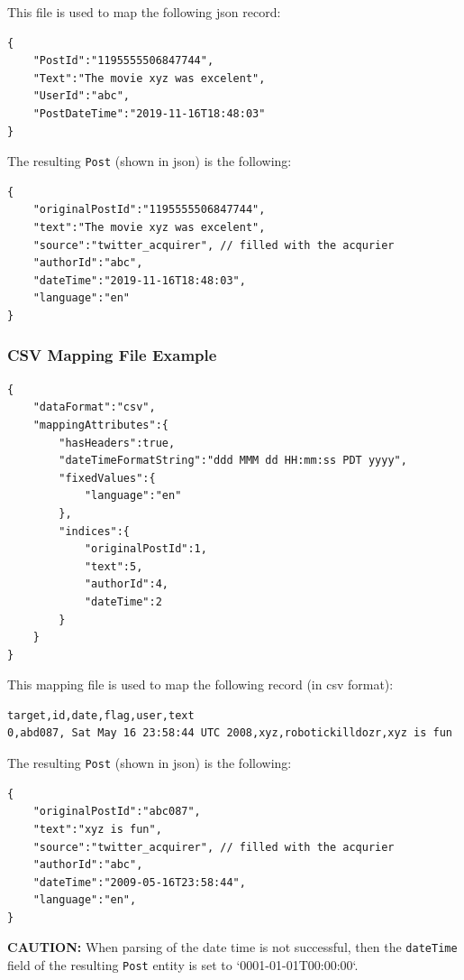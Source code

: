 \documentclass{article}
\begin{document}
This file is used to map the following json record:

\begin{lstlisting}
{
    "PostId":"1195555506847744",
    "Text":"The movie xyz was excelent",
    "UserId":"abc",
    "PostDateTime":"2019-11-16T18:48:03"
}
\end{lstlisting}

The resulting \texttt{Post} (shown in json) is the following:
\begin{lstlisting}
{
    "originalPostId":"1195555506847744",
    "text":"The movie xyz was excelent",
    "source":"twitter_acquirer", // filled with the acqurier
    "authorId":"abc",
    "dateTime":"2019-11-16T18:48:03",
    "language":"en"
}
\end{lstlisting}

\subsubsection{CSV Mapping File Example}\label{section:csv-mapping-file}
\begin{lstlisting}
{
    "dataFormat":"csv",
    "mappingAttributes":{
        "hasHeaders":true,
        "dateTimeFormatString":"ddd MMM dd HH:mm:ss PDT yyyy",
        "fixedValues":{
            "language":"en"
        },
        "indices":{
            "originalPostId":1,
            "text":5,
            "authorId":4,
            "dateTime":2
        }
    }
}
\end{lstlisting}

This mapping file is used to map the following record (in csv format):

\begin{lstlisting}
target,id,date,flag,user,text
0,abd087, Sat May 16 23:58:44 UTC 2008,xyz,robotickilldozr,xyz is fun
\end{lstlisting}

The resulting \texttt{Post} (shown in json) is the following:

\begin{lstlisting}
{
    "originalPostId":"abc087",
    "text":"xyz is fun",
    "source":"twitter_acquirer", // filled with the acqurier
    "authorId":"abc",
    "dateTime":"2009-05-16T23:58:44",
    "language":"en",  
}
\end{lstlisting}

\textbf{CAUTION:} When parsing of the date time is not successful, then the \texttt{dateTime} field of the resulting \texttt{Post} entity is set to `0001-01-01T00:00:00`.
\end{document}

